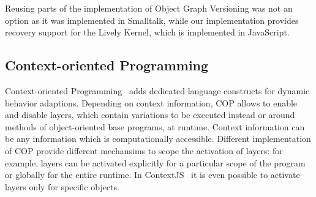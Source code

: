 
Reusing parts of the implementation of Object Graph Versioning was not an option as it was implemented in Smalltalk, while our implementation provides recovery support for the Lively Kernel, which is implemented in JavaScript.




\subsection{Context-oriented Programming}

Context-oriented Programming~\cite{Hirschfeld2008COP} adds dedicated language constructs for dynamic behavior adaptions.
Depending on context information, COP allows to enable and disable layers, which contain variations to be executed instead or around methods of object-oriented base programs, at runtime.
Context information can be any information which is computationally accessible.
Different implementation of COP provide different mechansims to scope the activation of layers: for example, layers can be activated explicitly for a particular scope of the program or globally for the entire runtime.
In ContextJS~\cite{Lincke2011OIC} it is even possible to activate layers only for specific objects.

